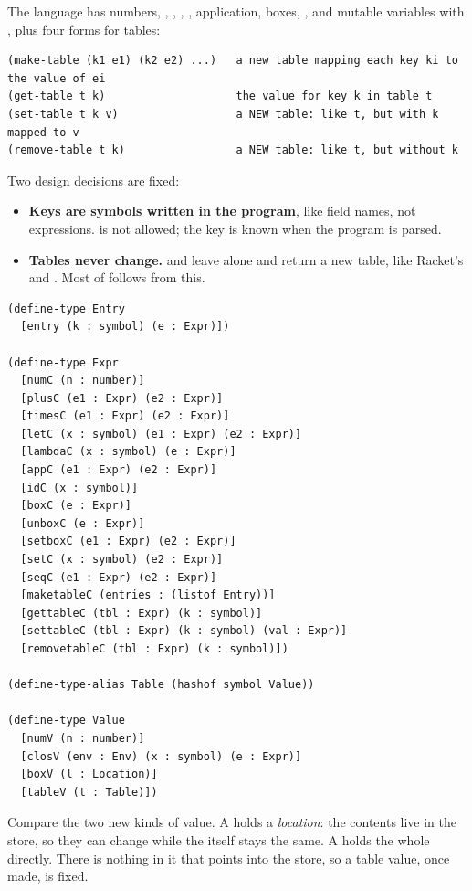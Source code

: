The language has numbers, \code{+}, \code{*}, , , application, boxes, , and mutable variables with , plus four forms for tables:
\begin{lstlisting}[style=repl]
(make-table (k1 e1) (k2 e2) ...)   a new table mapping each key ki to the value of ei
(get-table t k)                    the value for key k in table t
(set-table t k v)                  a NEW table: like t, but with k mapped to v
(remove-table t k)                 a NEW table: like t, but without k
\end{lstlisting}
Two design decisions are fixed:
\begin{itemize}
  \item \textbf{Keys are symbols written in the program}, like field names, not expressions.  is not allowed; the key is known when the program is parsed.
  \item \textbf{Tables never change.}  and  leave  alone and return a new table, like Racket's  and . Most of  follows from this.
\end{itemize}
\begin{lstlisting}
(define-type Entry
  [entry (k : symbol) (e : Expr)])

(define-type Expr
  [numC (n : number)]
  [plusC (e1 : Expr) (e2 : Expr)]
  [timesC (e1 : Expr) (e2 : Expr)]
  [letC (x : symbol) (e1 : Expr) (e2 : Expr)]
  [lambdaC (x : symbol) (e : Expr)]
  [appC (e1 : Expr) (e2 : Expr)]
  [idC (x : symbol)]
  [boxC (e : Expr)]
  [unboxC (e : Expr)]
  [setboxC (e1 : Expr) (e2 : Expr)]
  [setC (x : symbol) (e2 : Expr)]
  [seqC (e1 : Expr) (e2 : Expr)]
  [maketableC (entries : (listof Entry))]
  [gettableC (tbl : Expr) (k : symbol)]
  [settableC (tbl : Expr) (k : symbol) (val : Expr)]
  [removetableC (tbl : Expr) (k : symbol)])

(define-type-alias Table (hashof symbol Value))

(define-type Value
  [numV (n : number)]
  [closV (env : Env) (x : symbol) (e : Expr)]
  [boxV (l : Location)]
  [tableV (t : Table)])
\end{lstlisting}
Compare the two new kinds of value. A  holds a \emph{location}: the contents live in the store, so they can change while the  itself stays the same. A  holds the whole  directly. There is nothing in it that points into the store, so a table value, once made, is fixed.

